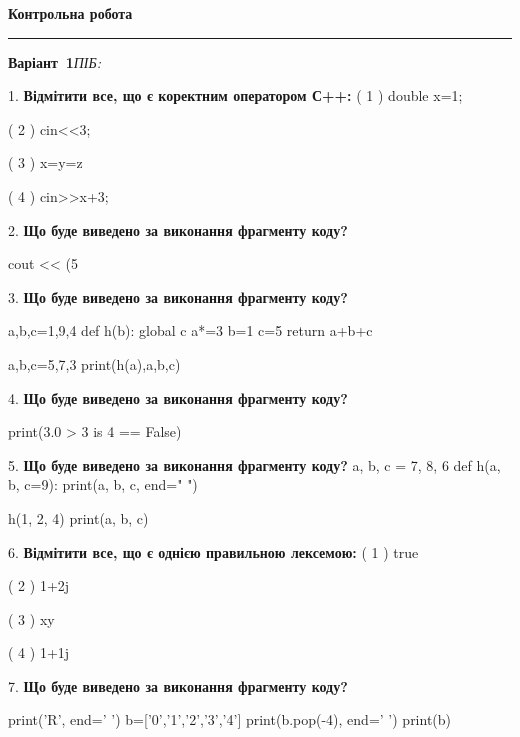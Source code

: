 \documentclass[11pt]{article}
\begin{document}
{\centering\Large\bfseries Контрольна робота\par}
\medskip
\noindent\rule{\linewidth}{0.5pt}
\smallskip
\noindent\textbf{Варіант \No\,1}\hfill \textit{ПІБ:}\,\underline{\hspace{60mm}}
\vspace{4mm}

1. %
\textbf{Відмітити все, що є коректним оператором С++:}
( 1 ) double x=1;

( 2 ) cin<<3;

( 3 ) x=y=z

( 4 ) cin>>x+3;
\vspace{5mm}

2. \textbf{Що буде виведено за виконання фрагменту коду?}

cout << (5 %
\vspace{5mm}

3. \textbf{Що буде виведено за виконання фрагменту коду?}

a,b,c=1,9,4
def h(b):
global c    a*=3
    b=1
    c=5
    return a+b+c

a,b,c=5,7,3
print(h(a),a,b,c)
\vspace{5mm}

4. \textbf{Що буде виведено за виконання фрагменту коду?}

print(3.0 > 3 is 4 == False)
\vspace{5mm}

5. \textbf{Що буде виведено за виконання фрагменту коду?}
a, b, c = 7, 8, 6
def h(a, b, c=9):
    print(a, b, c, end=" ")

h(1, 2, 4)
print(a, b, c)
\vspace{5mm}

6. %
\textbf{Відмітити все, що є однією правильною лексемою:}
( 1 ) true

( 2 ) 1+2j

( 3 ) xy

( 4 ) 1+1j
\vspace{5mm}

7. \textbf{Що буде виведено за виконання фрагменту коду?}

print('R', end=' ')
b=['0','1','2','3','4']
print(b.pop(-4), end=' ')
print(b)

\vspace{5mm}
\end{document}
